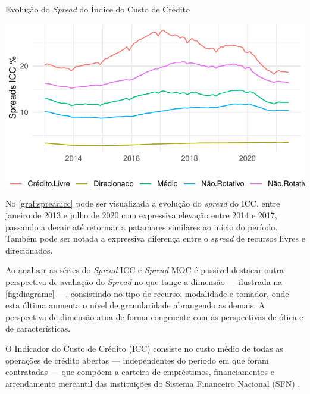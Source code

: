 \documentclass[
  12pt,
  12pt,
  openright,
  oneside,
  a4paper,
  chapter=TITLE,
  section=TITLE,
  subsection=TITLE,
  subsubsection=TITLE,
  english,
  portugues,
  sumario=tradicional]{abntex2}
\begin{document}
\begin{grafico}[!htbp]
\vspace{20pt}
\caption{Evolução do \emph{Spread} do Índice do Custo de Crédito}
\vspace{-4mm}

\begin{center}\includegraphics{12-exportedfigures/spread 2019 icc-1} \end{center}
\vspace{-3mm}
\label{graf:spreadicc}
\vspace{-2mm}
\end{grafico}

No \autoref{graf:spreadicc} pode ser visualizada a evolução do \emph{spread} do ICC, entre janeiro de 2013 e julho de 2020 com expressiva elevação entre 2014 e 2017, passando a decair até retormar a patamares similares ao início do período. Também pode ser notada a expressiva diferença entre o \emph{spread} de recursos livres e direcionados.

Ao analisar as séries do \emph{Spread} ICC e \emph{Spread} MOC é possível destacar outra perspectiva de avaliação do \emph{Spread} no que tange a dimensão --- ilustrada na \autoref{fig:diagramc} ---, consistindo no tipo de recurso, modalidade e tomador, onde esta última aumenta o nível de granularidade abrangendo as demais. A perspectiva de dimensão atua de forma congruente com as perspectivas de ótica e de características.

O Indicador do Custo de Crédito (ICC) consiste no custo médio de todas as operações de crédito abertas --- independentes do período em que foram contratadas --- que compõem a carteira de empréstimos, financiamentos e arrendamento mercantil das instituições do Sistema Financeiro Nacional (SFN) \cite{BCB:2000}.
\end{document}
